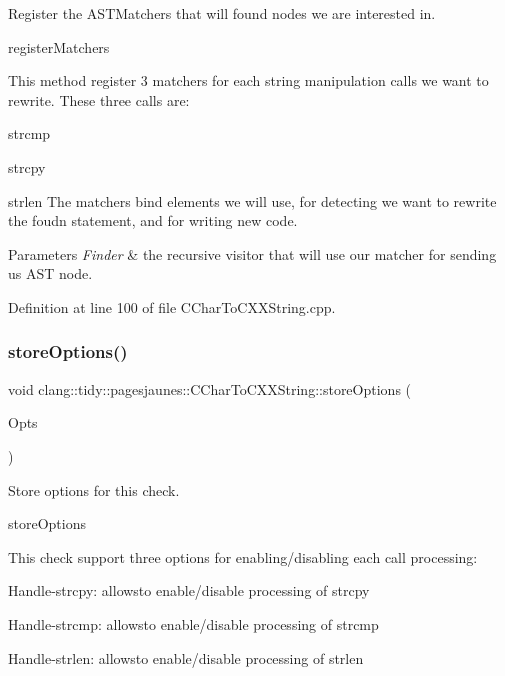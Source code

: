 Register the A\+S\+T\+Matchers that will found nodes we are interested in. 

register\+Matchers

This method register 3 matchers for each string manipulation calls we want to rewrite. These three calls are\+:
\begin{DoxyItemize}
\item strcmp
\item strcpy
\item strlen The matchers bind elements we will use, for detecting we want to rewrite the foudn statement, and for writing new code.
\end{DoxyItemize}


\begin{DoxyParams}{Parameters}
{\em Finder} & the recursive visitor that will use our matcher for sending us A\+ST node. \\
\hline
\end{DoxyParams}


Definition at line 100 of file C\+Char\+To\+C\+X\+X\+String.\+cpp.

\mbox{\label{classclang_1_1tidy_1_1pagesjaunes_1_1_c_char_to_c_x_x_string_ab1991d7f4de935f7e8d1e682569aa6e4}} 
\subsubsection{\texorpdfstring{store\+Options()}{storeOptions()}}
{\footnotesize\ttfamily void clang\+::tidy\+::pagesjaunes\+::\+C\+Char\+To\+C\+X\+X\+String\+::store\+Options (\begin{DoxyParamCaption}\item[{Clang\+Tidy\+Options\+::\+Option\+Map \&}]{Opts }\end{DoxyParamCaption})\hspace{0.3cm}{\ttfamily [override]}}



Store options for this check. 

store\+Options

This check support three options for enabling/disabling each call processing\+:
\begin{DoxyItemize}
\item Handle-\/strcpy\+: allowsto enable/disable processing of strcpy
\item Handle-\/strcmp\+: allowsto enable/disable processing of strcmp
\item Handle-\/strlen\+: allowsto enable/disable processing of strlen
\end{DoxyItemize}


